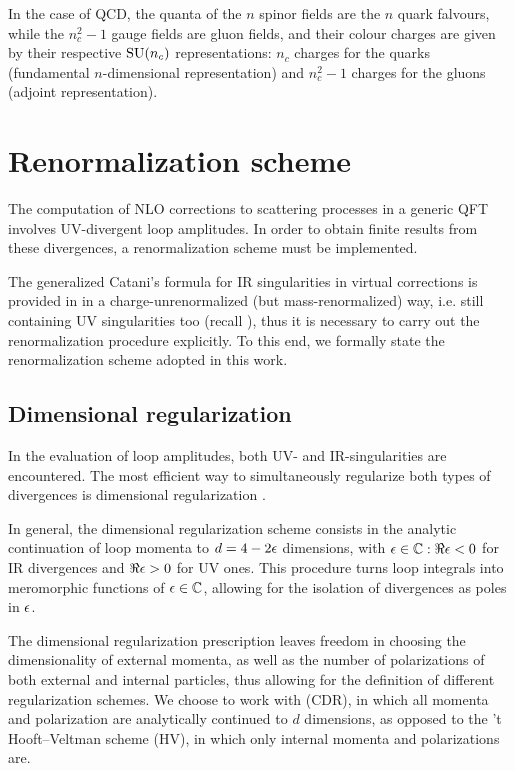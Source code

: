 In the case of QCD, the quanta of the $ n $ spinor fields are the $ n $ quark falvours, while the $ n_c^2 - 1 $ gauge fields are gluon fields, and their colour charges are given by their respective $ \mathrm{SU}(n_c) $ representations: $ n_c $ charges for the quarks (fundamental $ n $-dimensional representation) and $ n_c^2 - 1 $ charges for the gluons (adjoint representation).

\section{Renormalization scheme}
\label{sec:renorm}

The computation of NLO corrections to scattering processes in a generic QFT involves UV-divergent loop amplitudes. In order to obtain finite results from these divergences, a renormalization scheme must be implemented.

The generalized Catani's formula for IR singularities in virtual corrections is provided in \cite{Catani-2001} in a charge-unrenormalized (but mass-renormalized) way, i.e. still containing UV singularities too (recall ), thus it is necessary to carry out the renormalization procedure explicitly. To this end, we formally state the renormalization scheme adopted in this work.

\subsection{Dimensional regularization}
\label{ssec:dim-reg}

In the evaluation of loop amplitudes, both UV- and IR-singularities are encountered. The most efficient way to simultaneously regularize both types of divergences is dimensional regularization \cite{dim-reg}.

In general, the dimensional regularization scheme consists in the analytic continuation of loop momenta to $ d = 4 - 2 \epsilon $ dimensions, with $ \epsilon \in \mathbb{C} : \Re\epsilon < 0 $ for IR divergences and $ \Re\epsilon > 0 $ for UV ones. This procedure turns loop integrals into meromorphic functions of $ \epsilon \in \mathbb{C} $, allowing for the isolation of divergences as poles in $ \epsilon $.

The dimensional regularization prescription leaves freedom in choosing the dimensionality of external momenta, as well as the number of polarizations of both external and internal particles, thus allowing for the definition of different regularization schemes. We choose to work with  (CDR), in which all momenta and polarization are analytically continued to $ d $ dimensions, as opposed to the 't Hooft--Veltman scheme (HV), in which only internal momenta and polarizations are.

